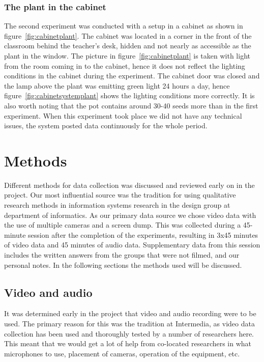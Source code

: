 \subsubsection*{The plant in the cabinet}
The second experiment was conducted with a setup in a cabinet as shown in figure~\ref{fig:cabinetplant}. The cabinet was located in a corner in the front of the classroom behind the teacher's desk, hidden and not nearly as accessible as the plant in the window. The picture in figure~\ref{fig:cabinetplant} is taken with light from the room coming in to the cabinet, hence it does not reflect the lighting conditions in the cabinet during the experiment. The cabinet door was closed and the lamp above the plant was emitting green light 24 hours a day, hence figure~\ref{fig:cabinetsystemplant} shows the lighting conditions more correctly. It is also worth noting that the pot contains around 30-40 seeds more than in the first experiment. When this experiment took place we did not have any technical issues, the system posted data continuously for the whole period.


\section{Methods}
Different methods for data collection was discussed and reviewed early on in the project. Our most influential source was the tradition for using qualitative research methods in information systems research in the design group at department of informatics. As our primary data source we chose video data with the use of multiple cameras and a screen dump. This was collected during a 45-minute session after the completion of the experiments, resulting in 3x45 minutes of video data and 45 minutes of audio data. Supplementary data from this session includes the written answers from the groups that were not filmed, and our personal notes. In the following sections the methods used will be discussed. 

\subsection{Video and audio}
It was determined early in the project that video and audio recording were to be used. The primary reason for this was the tradition at Intermedia, as video data collection has been used and thoroughly tested by a number of researchers here. This meant that we would get a lot of help from co-located researchers in what microphones to use, placement of cameras, operation of the equipment, etc. 

